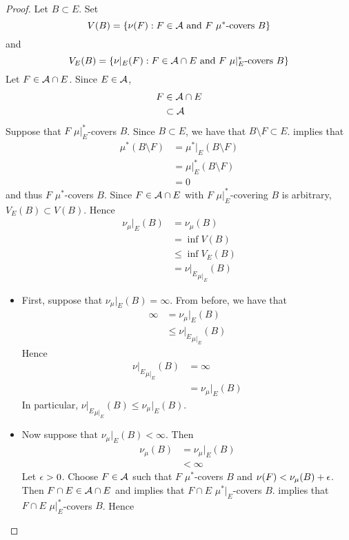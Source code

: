 \documentclass{book}
\begin{document}
	\begin{proof}
		Let $B \subset E$. Set 
		$$V(B) = \{ \nu(F): F \in \mathcal{A}\text{ and $F$ $\mu^*$-covers $B$} \}$$
		and 
		$$V_E(B) = \{ \nu|_E(F): F \in \mathcal{A} \cap E \text{ and $F$ $\mu|_E^*$-covers $B$} \}$$
		Let $F \in \mathcal{A} \cap E$. Since $E \in \mathcal{A}$,  
		\begin{align*}
			F
			& \in \mathcal{A} \cap E \\
			& \subset \mathcal{A}
		\end{align*}
		Suppose that $F$ $\mu|_E^*$-covers $B$. Since $B \subset E$, we have that $B \setminus F \subset E$.  implies that
		\begin{align*}
			\mu^*(B \setminus F)
			& = \mu^*|_E(B \setminus F) \\
			& = \mu|_E^*(B \setminus F) \\
			& = 0
		\end{align*} 
		and thus $F$ $\mu^*$-covers $B$. Since $F \in \mathcal{A} \cap E$ with $F$ $\mu|_E^*$-covering $B$ is arbitrary, $V_E(B) \subset V(B)$. Hence
		\begin{align*}
			\nu_{\mu}|_E(B) 
			& = \nu_{\mu}(B) \\
			& = \inf V(B) \\
			& \leq \inf V_E(B) \\
			& = {\nu|_E}_{\mu|_E} (B)
		\end{align*}
		\begin{itemize}
			\item First, suppose that $\nu_{\mu}|_E(B)  = \infty$. From before, we have that 
			\begin{align*}
				\infty
				& = \nu_{\mu}|_E(B) \\
				& \leq {\nu|_E}_{\mu|_E} (B)
			\end{align*} 
			Hence 
			\begin{align*}
				{\nu|_E}_{\mu|_E} (B)
				& = \infty \\
				& = \nu_{\mu}|_E(B)
			\end{align*}
			In particular, ${\nu|_E}_{\mu|_E}(B) \leq \nu_{\mu}|_E(B)$.
			\item Now suppose that $\nu_{\mu}|_E(B) < \infty$. Then 
			\begin{align*}
				\nu_{\mu}(B)
				& = \nu_{\mu}|_E(B) \\
				& < \infty 
			\end{align*} 
			Let $\epsilon >0$. Choose $F \in \mathcal{A}$ such that $F$ $\mu^*$-covers $B$ and $\nu(F) < \nu_{\mu}(B) + \epsilon$. Then $F \cap E \in \mathcal{A} \cap E$ and  implies that $F \cap E$ $\mu^*|_E$-covers $B$.  implies that $F \cap E$ $\mu|_E^*$-covers $B$. Hence 

\end{itemize}
\end{proof}
\end{document}
